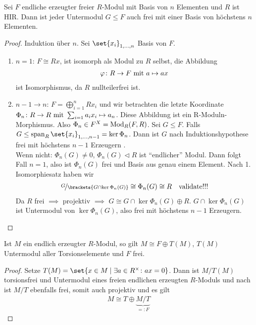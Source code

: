 \begin{proposition}
	Sei $F$ endliche erzeugter freier $R$-Modul mit Basis von $n$ Elementen und $R$ ist HIR. Dann ist jeder Untermodul $G \le F$ auch frei mit einer Basis von höchstens $n$ Elementen.
\end{proposition}
\begin{proof}
	Induktion über $n$. Sei $\set{x_i}_{1,\dots,n}$ Basis von $F$.
	\begin{enumerate}
		\item $n=1$: $F\cong Rx$, ist isomorph als Modul zu $R$ selbst, die Abbildung 
		\begin{align*}
			\varphi\colon R \to F \mit a \mapsto ax
		\end{align*}
		ist Isomorphismus, da $R$ nullteilerfrei ist.
		\item $n-1 \to n$: $F = \bigoplus_{i=1}^n Rx_i$ und wir betrachten die letzte Koordinate $\Phi_n\colon R \to R \mit \sum_{i=1}a_i x_i \mapsto a_n$. Diese Abbildung ist ein R-Moduln-Morphismus. Also $\Phi_n \in F^X = \Mod_R(F,R)$. Sei $G \le F$. Falls $G \le \Span_R\set{x_i}_{1,\dots,n-1} = \ker \Phi_n$. Dann ist $G$ nach Induktionshypothese frei mit höchstens $n-1$ Erzeugern \checkmark.\\
		Wenn nicht: $\Phi_n(G) \neq 0$, $\Phi_n(G) \lhd R$ ist ``endlicher'' Modul. Dann folgt Fall $n=1$, also ist $\Phi_n(G)$ frei und Basis aus genau einem Element. Nach 1. Isomorphiesatz haben wir
		\begin{align*}
			\lnkset{G}{\brackets{G\cap \ker \Phi_n(G)}} \cong \Phi_n(G) \cong R \quad \text{validate!!!}
		\end{align*} 
		Da $R$ frei $\implies$ projektiv $\implies$ $G \cong G \cap \ker \Phi_n(G) \oplus R$. $G \cap \ker \Phi_n(G)$ ist Untermodul von $\ker \Phi_n(G)$, also frei mit höchstens $n-1$ Erzeugern.
	\end{enumerate}
\end{proof}
\begin{conclusion}
	Ist $M$ ein endlich erzeugter $R$-Modul, so gilt $M \cong F \oplus T(M)$, $T(M)$ Untermodul aller Torsionselemente und $F$ frei.
\end{conclusion}
\begin{proof}
	Setze $T(M) = \set{x \in M \mid \exists a \in R^{\times}\colon ax = 0}$. Dann ist $M/T(M)$ torsionsfrei und Untermodul eines freien endlichen erzeugten $R$-Moduls und nach  ist $M/T$ ebenfalls frei, somit auch projektiv und es gilt
	\begin{align*}
		M \cong T \oplus \underbrace{M/T}_{=: F}
	\end{align*} 
\end{proof}
